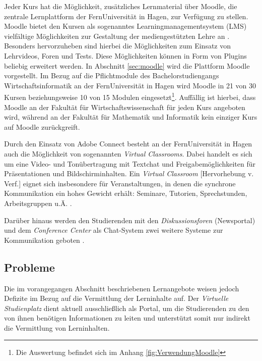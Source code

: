 Jeder Kurs hat die Möglichkeit, zusätzliches Lernmaterial über Moodle, die zentrale Lernplattform der FernUniversität in Hagen, zur Verfügung zu stellen. Moodle bietet den Kursen \glqq als sogenanntes Learningmanagementsystem (LMS) vielfältige Möglichkeiten zur Gestaltung der mediengestützten Lehre an\grqq{} \citep{fernuniversitaet2018moodle}. Besonders hervorzuheben sind hierbei die Möglichkeiten zum Einsatz von Lehrvideos, Foren und Tests. Diese Möglichkeiten können in Form von Plugins beliebig erweitert werden. In Abschnitt \ref{sec:moodle} wird die Plattform Moodle vorgestellt. Im Bezug auf die Pflichtmodule des Bachelorstudiengangs Wirtschaftsinformatik an der FernUniversität in Hagen wird Moodle in 21 von 30 Kursen beziehungsweise 10 von 15 Modulen eingesetzt\footnote{Die Auswertung befindet sich im Anhang \ref{fig:VerwendungMoodle}}. Auffällig ist hierbei, dass Moodle an der Fakultät für Wirtschaftswissenschaft für jeden Kurs angeboten wird, während an der Fakultät für Mathematik und Informatik kein einziger Kurs auf Moodle zurückgreift.


Durch den Einsatz von Adobe Connect besteht an der FernUniversität in Hagen auch die Möglichkeit von sogenannten \textit{Virtual Classrooms}. Dabei handelt es sich um eine Video- und Tonübertragung mit Textchat und Freigabemöglichkeiten für Präsentationen und Bildschirminhalten. \glqq Ein \emph{Virtual Classroom} [Hervorhebung v. Verf.] eignet sich insbesondere für Veranstaltungen, in denen die synchrone Kommunikation ein hohes Gewicht erhält: Seminare, Tutorien, Sprechstunden, Arbeitsgruppen u.Ä.\grqq{} \citep{fernuniversitaet2018kommunikationstools}.

Darüber hinaus werden den Studierenden mit den \textit{Diskussionsforen} (Newsportal) und dem \textit{Conference Center} als Chat-System zwei weitere Systeme zur Kommunikation geboten \citep{fernuniversitaet2018kommunikationstools}.


\subsection{Probleme}
Die im vorangegangen Abschnitt beschriebenen Lernangebote weisen jedoch Defizite im Bezug auf die Vermittlung der Lerninhalte auf. Der \textit{Virtuelle Studienplatz} dient aktuell ausschließlich als Portal, um die Studierenden zu den von ihnen benötigen Informationen zu leiten und unterstützt somit nur indirekt die Vermittlung von Lerninhalten.

